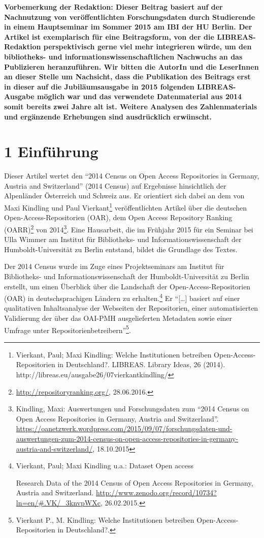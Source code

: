 \documentclass[a4paper,
fontsize=11pt,
oneside,
numbers=noperiodatend,
parskip=half-,
bibliography=totoc,
final
]{scrartcl}
\begin{document}
\textbf{Vorbemerkung der Redaktion: Dieser Beitrag basiert auf der
Nachnutzung von veröffentlichten Forschungsdaten durch Studierende in
einem Hauptseminar im Sommer 2015 am IBI der HU Berlin. Der Artikel ist
exemplarisch für eine Beitragsform, von der die LIBREAS-Redaktion
perspektivisch gerne viel mehr integrieren würde, um den bibliotheks-
und informationswissenschaftlichen Nachwuchs an das Publizieren
heranzuführen. Wir bitten die AutorIn und die LeserInnen an dieser
Stelle um Nachsicht, dass die Publikation des Beitrags erst in dieser
auf die Jubiläumsausgabe in 2015 folgenden LIBREAS-Ausgabe möglich war
und das verwendete Datenmaterial aus 2014 somit bereits zwei Jahre alt
ist. Weitere Analysen des Zahlenmaterials und ergänzende Erhebungen sind
ausdrücklich erwünscht.}

\section*{1 Einführung}\label{einfuxfchrung}

Dieser Artikel wertet den \enquote{2014 Census on Open Access
Repositories in Germany, Austria and Switzerland} (2014 Census) auf
Ergebnisse hinsichtlich der Alpenländer Österreich und Schweiz aus. Er
orientiert sich dabei an dem von Maxi Kindling und Paul
Vierkant\footnote{Vierkant, Paul; Maxi Kindling: Welche Institutionen
  betreiben Open-Access-Repositorien in Deutschland?. LIBREAS. Library
  Ideas, 26 (2014). http://libreas.eu/ausgabe26/07vierkantkindling/}
veröffentlichten Artikel über die deutschen Open-Access-Repositorien
(OAR), dem Open Access Repository Ranking (OARR)\footnote{\url{http://repositoryranking.org/},
  28.06.2016.} von 2014\footnote{Kindling, Maxi: Auswertungen und
  Forschungsdaten zum \enquote{2014 Census on Open Access Repositories
  in Germany, Austria and Switzerland}.
  \url{https://oanetzwerk.wordpress.com/2015/09/07/forschungsdaten-und-auswertungen-zum-2014-census-on-open-access-repositories-in-germany-austria-and-switzerland/},
  18.10.2015}. Eine Hausarbeit, die im Frühjahr 2015 für ein Seminar bei
Ulla Wimmer am Institut für Bibliotheks- und Informationswissenschaft
der Humboldt-Universität zu Berlin entstand, bildet die Grundlage des
Textes.

Der 2014 Census wurde im Zuge eines Projektseminars am Institut für
Bibliotheks- und Informationswissenschaft der Humboldt-Universität zu
Berlin erstellt, um einen Überblick über die Landschaft der
Open-Access-Repositorien (OAR) in deutschsprachigen Ländern zu
erhalten.\footnote{Vierkant, Paul; Maxi Kindling u.a.: Dataset Open
  access

  Research Data of the 2014 Census of Open Access Repositories in
  Germany, Austria and Switzerland.
  \url{http://www.zenodo.org/record/10734?ln=en/\#.VK/_3knvpWXc},
  26.02.2015.} Er \enquote{{[}\ldots{}{]} basiert auf einer qualitativen
Inhaltsanalyse der Webseiten der Repositorien, einer automatisierten
Validierung der über das OAI-PMH ausgelieferten Metadaten sowie einer
Umfrage unter Repositorienbetreibern}\footnote{Vierkant P., M. Kindling:
  Welche Institutionen betreiben Open-Access-Repositorien in
  Deutschland?.}.
\end{document}

